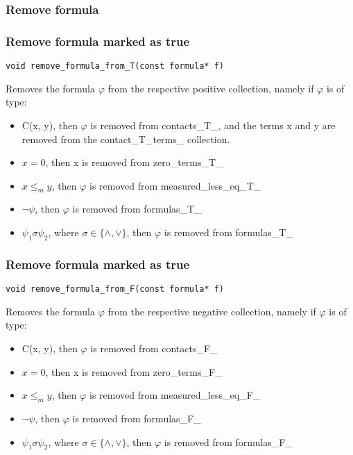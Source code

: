 \documentclass{article}
\begin{document}
			\subsubsection*{Remove formula}
			\subsubsection*{Remove formula marked as true}
				\begin{lstlisting}
void remove_formula_from_T(const formula* f)
				\end{lstlisting}
				Removes the formula $\varphi$ from the respective positive collection, namely
				if $\varphi$ is of type:
				\begin{itemize}
					\item C(x, y), then $\varphi$ is removed from contacts\_T\_, and the terms x and y are removed from the contact\_T\_terms\_ collection.
					\item $x = 0$, then x is removed from zero\_terms\_T\_
					\item $x \le_m y$, then $\varphi$ is removed from measured\_less\_eq\_T\_
					\item $\neg \psi$, then $\varphi$ is removed from formulas\_T\_
					\item $\psi_1 \sigma \psi_2$, where $\sigma \in \{\wedge, \vee\}$, then $\varphi$ is removed from formulas\_T\_
				\end{itemize}
			\subsubsection*{Remove formula marked as true}
				\begin{lstlisting}
void remove_formula_from_F(const formula* f)
				\end{lstlisting}
				Removes the formula $\varphi$ from the respective negative collection, namely
				if $\varphi$ is of type:
				\begin{itemize}
					\item C(x, y), then $\varphi$ is removed from contacts\_F\_
					\item $x = 0$, then x is removed from zero\_terms\_F\_
					\item $x \le_m y$, then $\varphi$ is removed from measured\_less\_eq\_F\_
					\item $\neg \psi$, then $\varphi$ is removed from formulas\_F\_
					\item $\psi_1 \sigma \psi_2$, where $\sigma \in \{\wedge, \vee\}$, then $\varphi$ is removed from formulas\_F\_
				\end{itemize}
\end{document}
